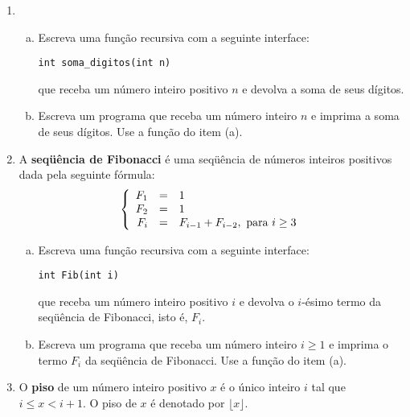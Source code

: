 \documentclass[a4paper,10pt]{article}
\begin{document}
\begin{enumerate}

\item 
\begin{enumerate}[(a)]

\item Escreva uma função recursiva com a seguinte interface:\\

\begin{lstlisting}
int soma_digitos(int n)
\end{lstlisting}

que receba um número inteiro positivo $n$ e devolva a soma de seus dígitos.\\

\item Escreva um programa que receba um número inteiro $n$ e imprima a soma de seus dígitos. Use a função do item (a).\\
\end{enumerate} %

\item  A \textbf{seqüência de Fibonacci} é uma seqüência de números inteiros positivos dada pela seguinte fórmula:
  \[ 
  \left\{ \begin{array}{rcl}
    F_1 & = & 1 \\
    F_2 & = & 1 \\
    F_i & = & F_{i-1} + F_{i-2},\ \textnormal{para}\ i\geq 3 
  \end{array}
  \right. 
  \]

\begin{enumerate}[(a)]
\item Escreva uma função recursiva com a seguinte interface:

\begin{lstlisting}
int Fib(int i)
\end{lstlisting}

que receba um número inteiro positivo $i$ e devolva o $i$-ésimo termo da seqüência de Fibonacci, isto é, $F_i$. 
  
\item Escreva um programa que receba um número inteiro $i \geq 1$ e imprima o termo $F_i$ da seqüência de Fibonacci. 
Use a função do item (a). 
\end{enumerate}



\item O \textbf{piso} de um número inteiro positivo $x$ é o único inteiro $i$ 
tal que $i \leq x < i + 1$. O piso de $x$ é denotado por $\lfloor x \rfloor$.   


\end{enumerate}
\end{document}
